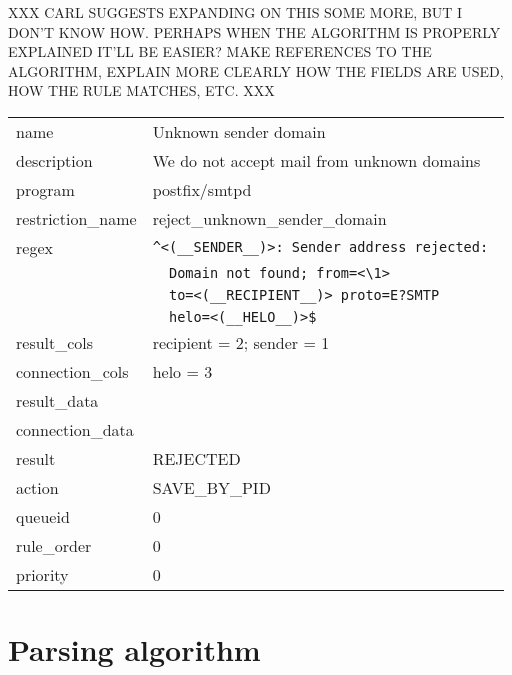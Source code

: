 \documentclass[a4paper,12pt,draft]{article}
\begin{document}
XXX CARL SUGGESTS EXPANDING ON THIS SOME MORE, BUT I DON'T KNOW HOW\@.
PERHAPS WHEN THE ALGORITHM IS PROPERLY EXPLAINED IT'LL BE EASIER\@?  MAKE
REFERENCES TO THE ALGORITHM, EXPLAIN MORE CLEARLY HOW THE FIELDS ARE USED,
HOW THE RULE MATCHES, ETC.  XXX

\begin{tabular}[]{ll}

name                & Unknown sender domain                             \\
description         & We do not accept mail from unknown domains        \\
program             & postfix/smtpd                                     \\
restriction\_name   & reject\_unknown\_sender\_domain                   \\
regex               & \verb!^<(__SENDER__)>: Sender address rejected: ! \\
                    & \verb!  Domain not found; from=<\1> !             \\
                    & \verb!  to=<(__RECIPIENT__)> proto=E?SMTP !       \\
                    & \verb!  helo=<(__HELO__)>$!                       \\
result\_cols        & recipient = 2; sender = 1                         \\
connection\_cols    & helo = 3                                          \\
result\_data        &                                                   \\
connection\_data    &                                                   \\
result              & REJECTED                                          \\
action              & SAVE\_BY\_PID                                     \\
queueid             & 0                                                 \\
rule\_order         & 0                                                 \\
priority            & 0                                                 \\

\end{tabular}


\section{Parsing algorithm}
\end{document}
